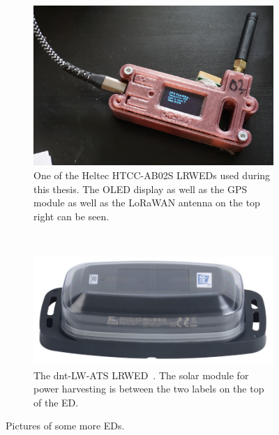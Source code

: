 \begin{figure}
    \centering

    \begin{subfigure}[t]{0.5\textwidth}
        \centering
        \includegraphics[width=1\textwidth]{pictures/hardware/gps-nodes/HTCC-AB02S.jpg}
        \caption{
            One of the Heltec HTCC-AB02S \aclp{LRWED} used during this thesis.
            The \acs{OLED} display as well as the \ac{GPS} module as well as the \ac{LoRaWAN} antenna on the top right can be seen.
        }\label{pic:heltec-htcc-ab02s}
    \end{subfigure}%
    ~
    \begin{subfigure}[t]{0.5\textwidth}
        \centering
        \includegraphics[width=1\textwidth]{pictures/hardware/gps-nodes/dnt-LW-ATS.jpg}
        \caption{
            The dnt-LW-ATS \acl{LRWED}~\protect\cite{dnt_gmbh_dnt_nodate}.
            The solar module for power harvesting is between the two labels on the top of the \acl{ED}.
        }\label{pic:dnt-lw-ats}
    \end{subfigure}

    \caption{Pictures of some more \aclp{ED}.}
\end{figure}

